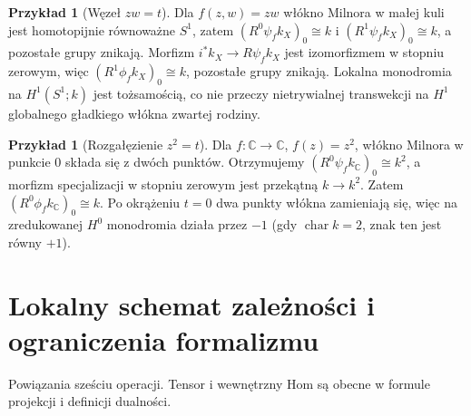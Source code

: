\documentclass[11pt,a4paper,oneside]{report}
\newcommand{\C}{\mathbb{C}}
\theoremstyle{plain}
\theoremstyle{definition}
\newtheorem{przyklad}[twierdzenie]{Przykład}
\theoremstyle{remark}
\begin{document}
\begin{przyklad}[Węzeł $zw=t$]
Dla $f(z,w)=zw$ włókno Milnora w małej kuli jest
homotopijnie równoważne $S^1$, zatem
$(R^0\psi_fk_X)_0\cong k$ i
$(R^1\psi_fk_X)_0\cong k$, a pozostałe grupy znikają.
Morfizm $i^*k_X\to R\psi_fk_X$ jest izomorfizmem
w stopniu zerowym, więc
$(R^1\phi_fk_X)_0\cong k$, pozostałe grupy znikają.
Lokalna monodromia na $H^1(S^1;k)$ jest tożsamością,
co nie przeczy nietrywialnej transwekcji na
$H^1$ globalnego gładkiego włókna zwartej rodziny.
\end{przyklad}
\begin{przyklad}[Rozgałęzienie $z^2=t$]
Dla $f:\C\to\C$, $f(z)=z^2$, włókno Milnora w
punkcie $0$ składa się z dwóch punktów.
Otrzymujemy $(R^0\psi_fk_\C)_0\cong k^2$, a
morfizm specjalizacji w stopniu zerowym jest przekątną
$k\to k^2$. Zatem $(R^0\phi_fk_\C)_0\cong k$.
Po okrążeniu $t=0$ dwa punkty włókna zamieniają się,
więc na zredukowanej $H^0$ monodromia działa przez $-1$
(gdy $\operatorname{char}k=2$, znak ten jest równy $+1$).
\end{przyklad}

\section{Lokalny schemat zależności i ograniczenia formalizmu}
\begin{center}
\par\smallskip\small Powiązania sześciu operacji. Tensor i wewnętrzny Hom
są obecne w formule projekcji i definicji dualności.
\end{center}
\end{document}
